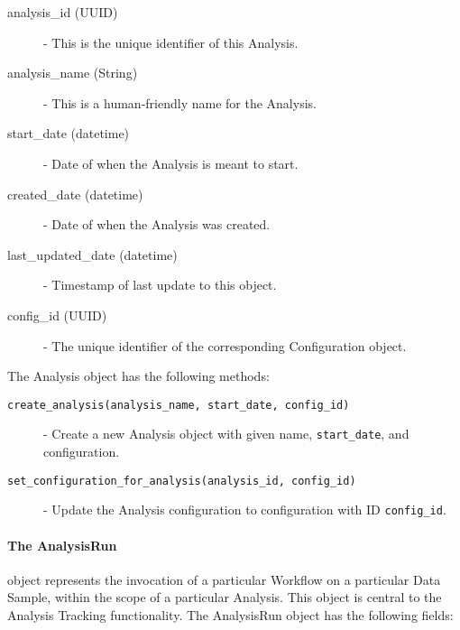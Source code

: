 \begin{description}
\item [analysis\_id (UUID)] - This is the unique identifier of this Analysis.
\item [analysis\_name (String)] - This is a human-friendly name for the Analysis.
\item [start\_date (datetime)] - Date of when the Analysis is meant to start.
\item [created\_date (datetime)] - Date of when the Analysis was created.
\item [last\_updated\_date (datetime)] - Timestamp of last update to this object.
\item [config\_id (UUID)] - The unique identifier of the corresponding Configuration object.
\end{description}

The Analysis object has the following methods:

\begin{description}
\item [\texttt{create_analysis(analysis_name, start_date, config_id)}] - Create a new Analysis object with given name, \texttt{start_date}, and configuration.
\item [\texttt{set_configuration_for_analysis(analysis_id, config_id)}] - Update the Analysis configuration to configuration with ID \texttt{config_id}.
\end{description}

\paragraph{The AnalysisRun} object represents the invocation of a particular Workflow on a particular Data Sample, within the scope of a particular Analysis. This object is central to the Analysis Tracking functionality. The AnalysisRun object has the following fields:

